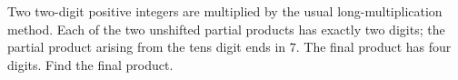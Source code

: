 Two two-digit positive integers are multiplied by the usual long-multiplication method. Each of the two unshifted partial products has exactly two digits; the partial product arising from the tens digit ends in $7$. The final product has four digits. Find the final product.
